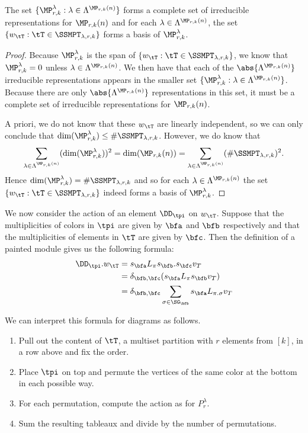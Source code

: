 \begin{theorem} The set $\{\MP_{r,k}^\lambda:\lambda\in\Lambda^{\MP_{r,k}(n)}\}$ forms a complete set of irreducible representations for $\MP_{r,k}(n)$ and for each $\lambda\in\Lambda^{\MP_{r,k}(n)}$, the set $\{w_\tT:\tT\in\SSMPT_{\lambda,r,k}\}$ forms a basis of $\MP_{r,k}^\lambda$.
\end{theorem}

\begin{proof} 
    Because $\MP_{r,k}^\lambda$ is the span of $\{w_\tT:\tT\in\SSMPT_{\lambda,r,k}\}$, we know that $\MP_{r,k}^\lambda=0$ unless $\lambda\in\Lambda^{\MP_{r,k}(n)}$. We then have that each of the $\abs{\Lambda^{\MP_{r,k}(n)}}$ irreducible representations appears in the smaller set $\{\MP_{r,k}^\lambda:\lambda\in\Lambda^{\MP_{r,k}(n)}\}$. Because there are only $\abs{\Lambda^{\MP_{r,k}(n)}}$ representations in this set, it must be a complete set of irreducible representations for $\MP_{r,k}(n)$.

    A priori, we do not know that these $w_\tT$ are linearly independent, so we can only conclude that $\dim(\MP_{r,k}^\lambda)\leq\#\SSMPT_{\lambda,r,k}$. However, we do know that
\[\sum_{\lambda\in\Lambda^{\MP_{r,k}(n)}}(\dim(\MP_{r,k}^\lambda))^2=\dim(\MP_{r,k}(n))=\sum_{\lambda\in\Lambda^{\MP_{r,k}(n)}}(\#\SSMPT_{\lambda,r,k})^2.\] Hence $\dim(\MP_{r,k}^\lambda)=\#\SSMPT_{\lambda,r,k}$ and so for each $\lambda\in\Lambda^{\MP_{r,k}(n)}$ the set $\{w_\tT:\tT\in\SSMPT_{\lambda,r,k}\}$ indeed forms a basis of $\MP_{r,k}^\lambda$.
\end{proof}

We now consider the action of an element $\DD_\tpi$ on $w_\tT$. Suppose that the multiplicities of colors in $\tpi$ are given by $\bfa$ and $\bfb$ respectively and that the multiplicities of elements in $\tT$ are given by $\bfc$. Then the definition of a painted module gives us the following formula: \begin{align*}
    \DD_\tpi.w_\tT&=s_\bfa L_\pi s_\bfb . s_\bfc v_T\\
                  &=\delta_{\bfb,\bfc}(s_\bfa L_\pi s_\bfb v_T)\\
                  &=\delta_{\bfb,\bfc}\sum_{\sigma\in\SG_\bfb}s_\bfa L_{\pi.\sigma} v_T
\end{align*}

We can interpret this formula for diagrams as follows.
\begin{enumerate}
    \item[(i)] Pull out the content of $\tT$, a multiset partition with $r$ elements from $[k]$, in a row above and fix the order.
    \item[(ii)] Place $\tpi$ on top and permute the vertices of the same color at the bottom in each possible way.
    \item[(iii)] For each permutation, compute the action as for $P_r^\lambda$.
    \item[(iv)] Sum the resulting tableaux and divide by the number of permutations.
\end{enumerate}

